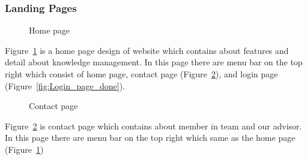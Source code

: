 \documentclass[12pt,oneside,openright,a4paper]{cpe-english-project}
\begin{document}
	\subsubsection{Landing Pages}
		\begin{figure}[!h]\centering
			\caption{Home page}\label{fig:Home_page_done}
		\end{figure}
		\begin{flushleft}
			Figure~\ref*{fig:Home_page_done} is a home page design of website which contains about features and detail about knowledge management. In this page there are menu bar on the top right which consist of home page, contact page (Figure~\ref*{fig:Contact_page_done}), and login page (Figure~\ref*{fig:Login_page_done}).
		\end{flushleft}

		\begin{figure}[!h]\centering
			\caption{Contact page}\label{fig:Contact_page_done}
		\end{figure}
		\begin{flushleft}
			Figure~\ref*{fig:Contact_page_done} is contact page which contains about member in team and our advisor. In this page there are menu bar on the top right which same as the home page (Figure~\ref*{fig:Home_page_done})
		\end{flushleft}
\end{document}
